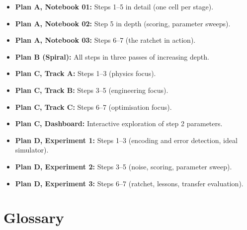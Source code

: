 \documentclass[11pt,a4paper,twoside]{report}
\theoremstyle{definition}
\begin{document}
\begin{notebook}[title={Where to See This in the Notebooks}]
\begin{itemize}[nosep]
  \item \textbf{Plan A, Notebook 01:} Steps 1--5 in detail (one cell per
        stage).
  \item \textbf{Plan A, Notebook 02:} Step 5 in depth (scoring,
        parameter sweeps).
  \item \textbf{Plan A, Notebook 03:} Steps 6--7 (the ratchet in
        action).
  \item \textbf{Plan B (Spiral):} All steps in three passes of
        increasing depth.
  \item \textbf{Plan C, Track A:} Steps 1--3 (physics focus).
  \item \textbf{Plan C, Track B:} Steps 3--5 (engineering focus).
  \item \textbf{Plan C, Track C:} Steps 6--7 (optimisation focus).
  \item \textbf{Plan C, Dashboard:} Interactive exploration of step 2
        parameters.
  \item \textbf{Plan D, Experiment 1:} Steps 1--3 (encoding and error
        detection, ideal simulator).
  \item \textbf{Plan D, Experiment 2:} Steps 3--5 (noise, scoring,
        parameter sweep).
  \item \textbf{Plan D, Experiment 3:} Steps 6--7 (ratchet, lessons,
        transfer evaluation).
\end{itemize}
\end{notebook}

\chapter{Glossary}
\label{ch:glossary}
\end{document}
